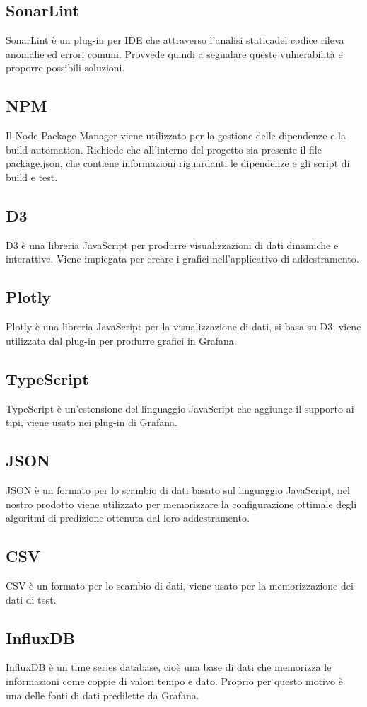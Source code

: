 	\subsection{SonarLint}
		SonarLint è un plug-in per IDE che attraverso l'analisi statica\glosp del codice rileva anomalie ed errori comuni. Provvede quindi a segnalare queste vulnerabilità e proporre possibili soluzioni.
	\subsection{NPM}
		Il Node Package Manager viene utilizzato per la gestione delle dipendenze e la build automation.
		Richiede che all'interno del progetto sia presente il file package.json, che contiene informazioni riguardanti le dipendenze e gli script di build e test.
	\subsection{D3}
		D3 è una libreria JavaScript per produrre visualizzazioni di dati dinamiche e interattive. Viene impiegata per creare i grafici nell'applicativo di addestramento.
	\subsection{Plotly}
		Plotly è una libreria JavaScript per la visualizzazione di dati, si basa su D3, viene utilizzata dal plug-in per produrre grafici in Grafana\glo.
	\subsection{TypeScript}
		TypeScript è un'estensione del linguaggio JavaScript che aggiunge il supporto ai tipi, viene usato nei plug-in di Grafana\glo.
	\subsection{JSON}
		JSON è un formato per lo scambio di dati basato sul linguaggio JavaScript, nel nostro prodotto viene utilizzato per memorizzare la configurazione ottimale degli algoritmi di predizione ottenuta dal loro addestramento.
	\subsection{CSV}
		CSV è un formato per lo scambio di dati, viene usato per la memorizzazione dei dati di test.
	\subsection{InfluxDB}
		InfluxDB è un time series database, cioè una base di dati che memorizza le informazioni come coppie di valori tempo e dato. Proprio per questo motivo è una delle fonti di dati predilette da Grafana\glo.
